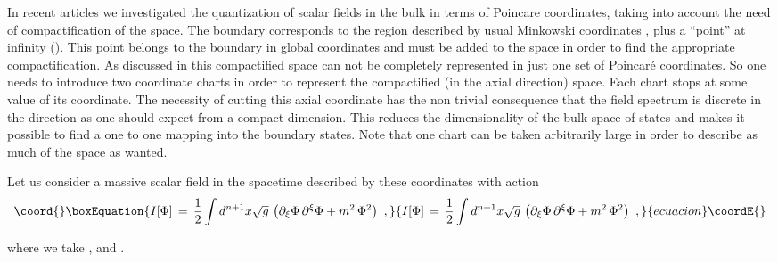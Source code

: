 \documentclass[a4paper,12pt]{article}
\begin{document}
In recent articles \cite{BB1,BB2} we investigated the quantization of scalar 
fields  in the \coordHE{} bulk in terms of Poincare coordinates, taking into account the
need of compactification of the space.
The \coordHE{} boundary  corresponds to the region \coordHE{} 
described by usual Minkowski coordinates \coordHE{} , \coordHE{} plus 
a ``point'' at infinity (\coordHE{}).
This point belongs to the boundary  in global coordinates
and must be added to the space in order to
find the appropriate compactification.
As discussed in \cite{BB1,BB2} this compactified \coordHE{} space can not be completely 
represented in just one set of Poincar\'e coordinates. 
So one needs to introduce two coordinate charts in order to 
represent the compactified (in the axial \coordHE{} direction) \coordHE{} space. 
Each chart stops at some value of its \coordHE{} coordinate.
The necessity of cutting this axial coordinate has 
the non trivial consequence that the field spectrum is discrete
in the \coordHE{} direction as one should expect from a compact 
dimension. This reduces the dimensionality of the bulk space of states 
and makes it possible to find a one to one mapping  into the  boundary  states.
Note that one chart can be taken arbitrarily large in order to describe as much
of the \coordHE{} space as wanted.


Let us  consider a massive scalar field \myHighlight{$\Phi$}\coordHE{} in the \coordHE{}
spacetime described by these coordinates with action
\begin{equation}\coord{}\boxEquation{
\label{action1}
I[\Phi ]\,=\, {1\over 2} \int d^{n+1}x \sqrt{g}\,
\left(\partial_\xi \Phi \, \partial^\xi \Phi
+m^2\,\Phi^2 \right)
\,\,,
}{
I[\Phi ]\,=\, {1\over 2} \int d^{n+1}x \sqrt{g}\,
\left(\partial_\xi \Phi \, \partial^\xi \Phi
+m^2\,\Phi^2 \right)
\,\,,
}{ecuacion}\coordE{}\end{equation}
  
\noindent where we take \coordHE{},
\coordHE{} and \coordHE{}.
   
\end{document}
